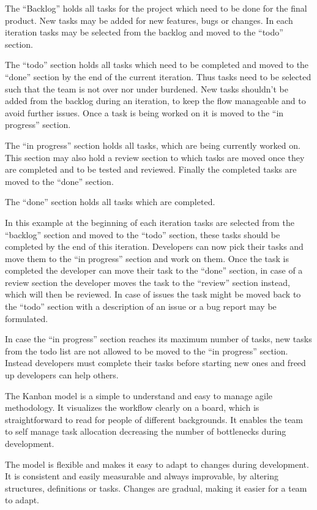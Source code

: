 \documentclass[runningheads]{llncs}
\begin{document}
The “Backlog” holds all tasks for the project which need to be done for the final product. New tasks may be added for new features, 
bugs or changes. In each iteration tasks may be selected from the backlog and moved to the “todo” section.

The “todo” section holds all tasks which need to be completed and moved to the “done” section by the end of the current iteration. 
Thus tasks need to be selected such that the team is not over nor under burdened. New tasks shouldn’t be added from the backlog during 
an iteration, to keep the flow manageable and to avoid further issues. Once a task is being worked on it is moved to the “in progress” section.

The “in progress” section holds all tasks, which are being currently worked on. This section may also hold a review section to which 
tasks are moved once they are completed and to be tested and reviewed. Finally the completed tasks are moved to the “done” section.

The “done” section holds all tasks which are completed.

In this example at the beginning of each iteration tasks are selected from the “backlog” section and moved to the “todo” section, 
these tasks should be completed by the end of this iteration. Developers can now pick their tasks and move them to the “in progress” 
section and work on them. Once the task is completed the developer can move their task to the “done” section, in case of a review section 
the developer moves the task to the “review” section instead, which will then be reviewed. In case of issues the task might be moved back 
to the “todo” section with a description of an issue or a bug report may be formulated.

In case the “in progress” section reaches its maximum number of tasks, new tasks from the todo list are not allowed to be moved to the 
“in progress” section. Instead developers must complete their tasks before starting new ones and freed up developers can help others. 

The Kanban model is a simple to understand and easy to manage agile methodology. It visualizes the workflow clearly on a board, which 
is straightforward to read for people of different backgrounds. It enables the team to self manage task allocation decreasing the 
number of bottlenecks during development.

The model  is flexible and makes it easy to adapt to changes during development. It is consistent and easily measurable and always 
improvable, by altering structures, definitions or tasks. Changes are gradual, making it easier for a team to adapt.
\end{document}
